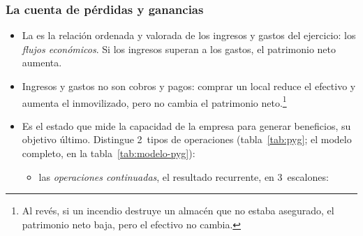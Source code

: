 \documentclass[11pt]{article}
\begin{document}
\begin{infografia}[H]
\centering
\caption{El balance por masas patrimoniales}\label{figu:balance-masas-paso1}
\end{infografia}

\subsubsection{La cuenta de pérdidas y ganancias}\label{sec:pyg}

\begin{itemize}
\item La  es la relación ordenada y valorada de los ingresos y gastos del ejercicio: los \emph{flujos económicos}. Si los ingresos superan a los gastos, el patrimonio neto aumenta.
\item Ingresos y gastos no son cobros y pagos: comprar un local reduce el efectivo y aumenta el inmovilizado, pero no cambia el patrimonio neto.\footnote{Al revés, si un incendio destruye un almacén que no estaba asegurado, el patrimonio neto baja, pero el efectivo no cambia.}
\item Es el estado que mide la capacidad de la empresa para generar beneficios, su objetivo último. Distingue 2~tipos de operaciones (tabla~\ref{tab:pyg}; el modelo completo, en la tabla~\ref{tab:modelo-pyg}):
  \begin{itemize}
  \item las \emph{operaciones continuadas}, el resultado recurrente, en 3~escalones:
    \begin{itemize}

\end{itemize}
\end{itemize}
\end{itemize}
\end{document}
